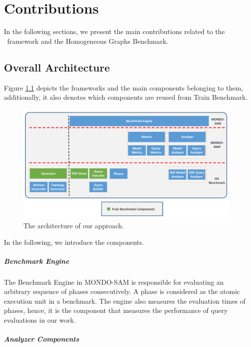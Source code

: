 \chapter{Contributions}

In the following sections, we present the main contributions related to the \framework~framework and the Homogeneous Graphs Benchmark.

\section{Overall Architecture}

Figure \ref{fig:architecture} depicts the frameworks and the main components belonging to them, additionally, it also denotes which components are reused from Train Benchmark.

\begin{figure}[!ht]
	\centering
	\includegraphics[width=150mm, keepaspectratio]{figures/architecture.pdf}
	\caption{The architecture of our approach.}
	\label{fig:architecture}
\end{figure}

In the following, we introduce the components.

\paragraph{Benchmark Engine}
The \textsf{Benchmark Engine} in MONDO-SAM is responsible for evaluating an arbitrary sequence of phases consecutively. A phase is considered as the atomic execution unit in a benchmark. The engine also measures the evaluation times of phases, hence, it is the component that measures the performance of query evaluations in our work.

\paragraph{Analyzer Components}

